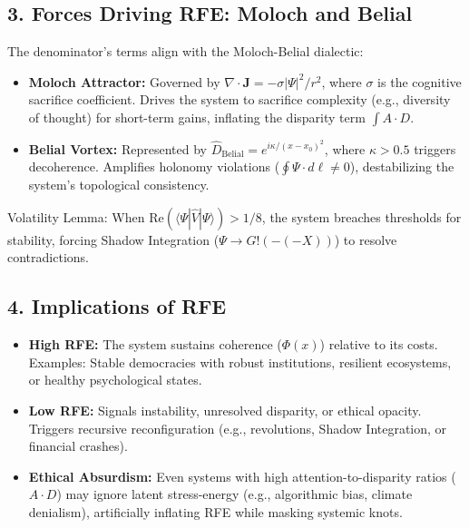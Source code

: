 \documentclass[11pt]{article}
\begin{document}
\subsection*{3. Forces Driving RFE: Moloch and Belial}
The denominator’s terms align with the Moloch-Belial dialectic:
\begin{itemize}
    \item \textbf{Moloch Attractor:} Governed by \(\nabla \cdot \mathbf{J} = -\sigma|\Psi|^2 / r^2\), where \(\sigma\) is the cognitive sacrifice coefficient. Drives the system to sacrifice complexity (e.g., diversity of thought) for short-term gains, inflating the disparity term \(\int A \cdot D\).
    \item \textbf{Belial Vortex:} Represented by \(\hat{D}_{\text{Belial}} = e^{i\kappa / (x - x_0)^2}\), where \(\kappa > 0.5\) triggers decoherence. Amplifies holonomy violations (\(\oint\Psi \cdot d\ell \neq 0\)), destabilizing the system’s topological consistency.
\end{itemize}
Volatility Lemma: When \(\text{Re}(\langle\Psi|\hat{V}|\Psi\rangle) > 1/8\), the system breaches thresholds for stability, forcing Shadow Integration (\(\Psi \to G!(-(-X))\)) to resolve contradictions.

\subsection*{4. Implications of RFE}
\begin{itemize}
    \item \textbf{High RFE:} The system sustains coherence (\(\Phi(x)\)) relative to its costs. Examples: Stable democracies with robust institutions, resilient ecosystems, or healthy psychological states.
    \item \textbf{Low RFE:} Signals instability, unresolved disparity, or ethical opacity. Triggers recursive reconfiguration (e.g., revolutions, Shadow Integration, or financial crashes).
    \item \textbf{Ethical Absurdism:} Even systems with high attention-to-disparity ratios (\(A \cdot D\)) may ignore latent stress-energy (e.g., algorithmic bias, climate denialism), artificially inflating RFE while masking systemic knots.
\end{itemize}
\end{document}
